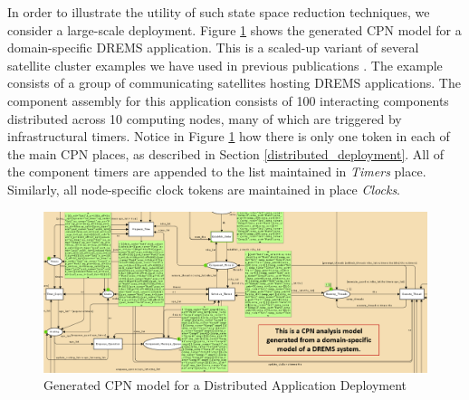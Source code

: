 
In order to illustrate the utility of such state space reduction techniques, we consider a large-scale deployment. Figure \ref{fig:gm} shows the generated CPN model for a domain-specific DREMS application. This is a scaled-up variant of several satellite cluster examples we have used in previous publications \cite{DREMS13Software, kumar2014colored}. The example consists of a group of communicating satellites hosting DREMS applications. The component assembly for this application consists of 100 interacting components distributed across 10 computing nodes, many of which are triggered by infrastructural timers. Notice in Figure \ref{fig:gm} how there is only one token in each of the main CPN places, as described in Section \ref{distributed_deployment}. All of the component timers are appended to the list maintained in \emph{Timers} place. Similarly, all node-specific clock tokens are maintained in place \emph{Clocks}.  

\begin{figure}[h]
	\centering
	\includegraphics[width=\textwidth]{./figs/Generated_Model}
	\caption{Generated CPN model for a Distributed Application Deployment}
	\label{fig:gm}
\end{figure}

